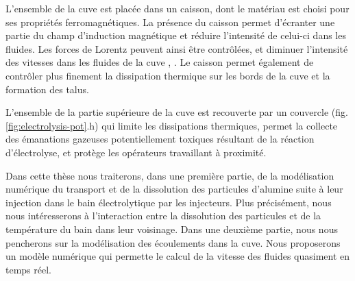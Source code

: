 L'ensemble de la cuve est placée dans un caisson, dont le matériau est
choisi pour ses propriétés ferromagnétiques. La présence du caisson
permet d'écranter une partie du champ d'induction magnétique et
réduire l'intensité de celui-ci dans les fluides. Les forces de
Lorentz peuvent ainsi être contrôlées, et diminuer l'intensité des
vitesses dans les fluides de la cuve \cite{Descloux1998},
\cite{Descloux1991}.  Le caisson permet également de contrôler plus
finement la dissipation thermique sur les bords de la cuve et la
formation des talus.

L'ensemble de la partie supérieure de la cuve est recouverte par un
couvercle (fig. \ref{fig:electrolysis-pot}.h) qui limite les
dissipations thermiques, permet la collecte des émanations gazeuses
potentiellement toxiques résultant de la réaction d'électrolyse, et
protège les opérateurs travaillant à proximité.

Dans cette thèse nous traiterons, dans une première partie, de la
modélisation numérique du transport et de la dissolution des
particules d'alumine suite à leur injection dans le bain
électrolytique par les injecteurs. Plus précisément, nous nous
intéresserons à l'interaction entre la dissolution des particules et
de la température du bain dans leur voisinage. Dans une deuxième
partie, nous nous pencherons sur la modélisation des écoulements dans
la cuve. Nous proposerons un modèle numérique qui permette le calcul
de la vitesse des fluides quasiment en temps réel.
